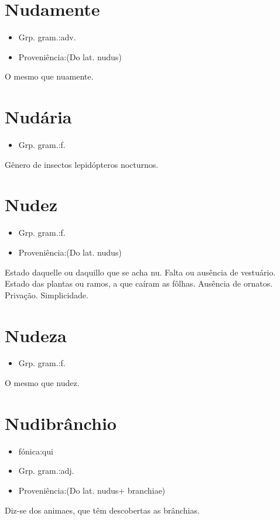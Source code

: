 \section{Nudamente}
\begin{itemize}
\item {Grp. gram.:adv.}
\end{itemize}
\begin{itemize}
\item {Proveniência:(Do lat. \textunderscore nudus\textunderscore )}
\end{itemize}
O mesmo que \textunderscore nuamente\textunderscore .
\section{Nudária}
\begin{itemize}
\item {Grp. gram.:f.}
\end{itemize}
Gênero de insectos lepidópteros nocturnos.
\section{Nudez}
\begin{itemize}
\item {Grp. gram.:f.}
\end{itemize}
\begin{itemize}
\item {Proveniência:(Do lat. \textunderscore nudus\textunderscore )}
\end{itemize}
Estado daquelle ou daquillo que se acha nu.
Falta ou ausência de vestuário.
Estado das plantas ou ramos, a que caíram as fôlhas.
Ausência de ornatos.
Privação.
Simplicidade.
\section{Nudeza}
\begin{itemize}
\item {Grp. gram.:f.}
\end{itemize}
O mesmo que \textunderscore nudez\textunderscore .
\section{Nudibrânchio}
\begin{itemize}
\item {fónica:qui}
\end{itemize}
\begin{itemize}
\item {Grp. gram.:adj.}
\end{itemize}
\begin{itemize}
\item {Proveniência:(Do lat. \textunderscore nudus\textunderscore  + \textunderscore branchiae\textunderscore )}
\end{itemize}
Diz-se dos animaes, que têm descobertas as brânchias.
